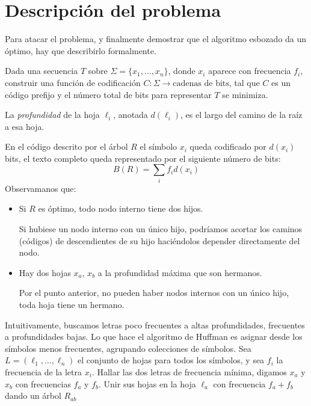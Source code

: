 \section{Descripción del problema}

  Para atacar el problema,
  y finalmente demostrar que el algoritmo esbozado da un óptimo,
  hay que describirlo formalmente.

  Dada una secuencia \(T\) sobre \(\Sigma = \{x_1, \ldots, x_n\}\),
  donde \(x_i\) aparece con frecuencia \(f_i\),
  construir una función de codificación
    \(C \colon \Sigma \rightarrow \text{cadenas de bits}\),
  tal que \(C\) es un código prefijo
  y el número total de bits para representar \(T\) se minimiza.
  \begin{definition}
    La \emph{profundidad} de la hoja \(\ell _i\),
    anotada \(d(\ell _i)\),
    es el largo del camino de la raíz a esa hoja.
  \end{definition}
  En el código descrito por el árbol \(R\)
  el símbolo \(x_i\) queda codificado por \(d(x_i)\) bits,
  el texto completo queda representado por el siguiente número de bits:
  \begin{equation*}
    B(R)
      = \sum_i f_i d(x_i)
  \end{equation*}
  Observamanos que:
  \begin{itemize}
  \item
    Si \(R\) es óptimo,
    todo nodo interno tiene dos hijos.

    Si hubiese un nodo interno con un único hijo,
    podríamos acortar los caminos
    (códigos)
    de descendientes de su hijo
    haciéndolos depender directamente del nodo.
  \item
    Hay dos hojas \(x_a\), \(x_b\)
    a la profundidad máxima que son hermanos.

    Por el punto anterior,
    no pueden haber nodos internos con un único hijo,
    toda hoja tiene un hermano.
  \end{itemize}
  Intuitivamente,
  buscamos letras poco frecuentes a altas profundidades,
  frecuentes a profundidades bajas.
  Lo que hace el algoritmo de Huffman
  es asignar desde los símbolos menos frecuentes,
  agrupando colecciones de símbolos.
  Sea \(L = (\ell_1, \ldots, \ell_n)\) el conjunto de hojas
  para todos los símbolos,
  y sea \(f_i\) la frecuencia de la letra \(x_i\).
  Hallar las dos letras de frecuencia mínima,
  digamos \(x_a\) y \(x_b\) con frecuencias \(f_a\) y \(f_b\).
  Unir sus hojas en la hoja \(\ell_{a }\) con frecuencia \(f_a+f_b\)
  dando un árbol \(R_{a b}\)
